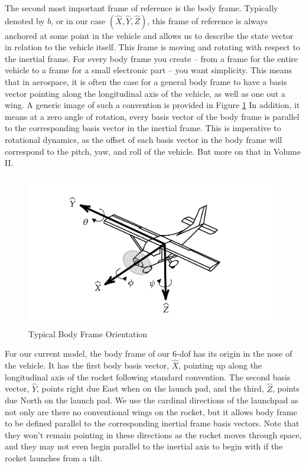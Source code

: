 \documentclass[12pt]{report}
\begin{document}
The second most important frame of reference is the \gls{body frame}. Typically denoted by $b$, or in our case $(\hat{X},\hat{Y},\hat{Z})$, this frame of reference is always anchored at some point in the vehicle and allows us to describe the \gls{state vector} in relation to the vehicle itself. This frame is moving and rotating with respect to the \gls{inertial frame}. For every \gls{body frame} you create – from a frame for the entire vehicle to a frame for a small electronic part – you want simplicity. This means that in aerospace, it is often the case for a general \gls{body frame} to have a basis vector pointing along the longitudinal axis of the vehicle, as well as one out a wing. A generic image of such a convention is provided in Figure \ref{fig:BodyFrameTypical} In addition, it means at a zero angle of rotation, every basis vector of the \gls{body frame} is parallel to the corresponding basis vector in the \gls{inertial frame}. This is imperative to rotational dynamics, as the offset of each basis vector in the \gls{body frame} will correspond to the pitch, yaw, and roll of the vehicle. But more on that in Volume II.


\begin{figure}[H]
\centering
    
\includegraphics[width=\linewidth]{Images/TypicalBodyFrame.png}
    \caption{Typical Body Frame Orientation}
    \label{fig:BodyFrameTypical}
\end{figure}

For our current model, the \gls{body frame} of our 6-\gls{dof} has its origin in the nose of the vehicle. It has the first body basis vector, $\hat{X}$, pointing up along the longitudinal axis of the rocket following standard convention. The second basis vector, $\hat{Y}$, points right due East when on the launch pad, and the third, $\hat{Z}$, points due North on the launch pad. We use the cardinal directions of the launchpad as not only are there no conventional wings on the rocket, but it allows \gls{body frame} to be defined parallel to the corresponding \gls{inertial frame} basis vectors. Note that they won’t remain pointing in these directions as the rocket moves through space, and they may not even begin parallel to the inertial axis to begin with if the rocket launches from a tilt.
\end{document}

